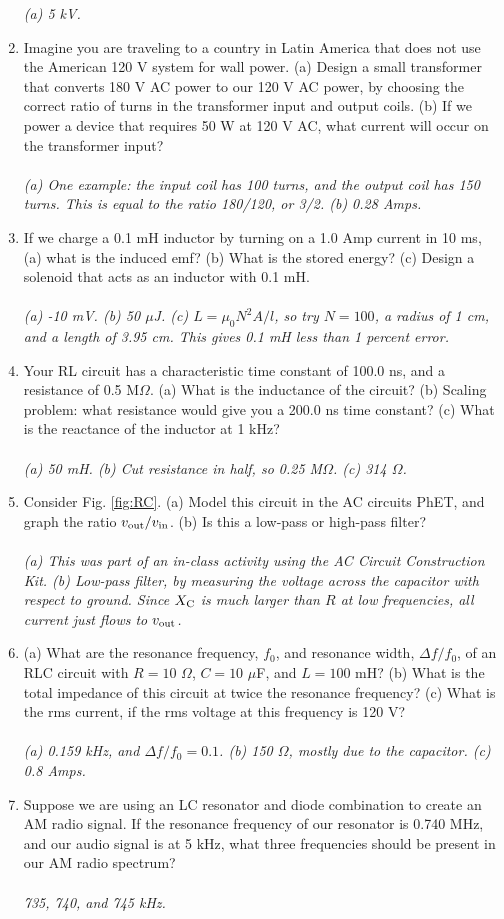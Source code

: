 \documentclass[12pt,twocolumn]{article}
\begin{document}
\begin{enumerate}
\textit{(a) 5 kV.}
\item Imagine you are traveling to a country in Latin America that does not use the American 120 V system for wall power.  (a) Design a small transformer that converts 180 V AC power to our 120 V AC power, by choosing the correct ratio of turns in the transformer input and output coils. (b) If we power a device that requires 50 W at 120 V AC, what current will occur on the transformer input? \\ \\
\textit{(a) One example: the input coil has 100 turns, and the output coil has 150 turns.  This is equal to the ratio 180/120, or 3/2. (b) 0.28 Amps.}
\item If we charge a 0.1 mH inductor by turning on a 1.0 Amp current in 10 ms, (a) what is the induced emf? (b) What is the stored energy? (c) Design a solenoid that acts as an inductor with 0.1 mH. \\ \\
\textit{(a) -10 mV. (b) 50 $\mu$J. (c) $L = \mu_0 N^2 A / l$, so try $N = 100$, a radius of 1 cm, and a length of 3.95 cm.  This gives 0.1 mH less than 1 percent error.}
\item Your RL circuit has a characteristic time constant of 100.0 ns, and a resistance of 0.5 M$\Omega$. (a) What is the inductance of the circuit? (b) Scaling problem: what resistance would give you a 200.0 ns time constant? (c) What is the reactance of the inductor at 1 kHz? \\ \\
\textit{(a) 50 mH. (b) Cut resistance in half, so 0.25 M$\Omega$. (c) 314 $\Omega$.}
\item Consider Fig. \ref{fig:RC}.  (a) Model this circuit in the AC circuits PhET, and graph the ratio $v_{\rm out}/v_{\rm in}$. (b) Is this a low-pass or high-pass filter? \\ \\
\textit{(a) This was part of an in-class activity using the AC Circuit Construction Kit.  (b) Low-pass filter, by measuring the voltage across the capacitor with respect to ground.  Since $X_{\rm C}$ is much larger than $R$ at low frequencies, all current just flows to $v_{\rm out}$. }
\item (a) What are the resonance frequency, $f_0$, and resonance width, $\Delta f/f_0$, of an RLC circuit with $R = 10$ $\Omega$, $C = 10$ $\mu$F, and $L = 100$ mH? (b) What is the total impedance of this circuit at twice the resonance frequency? (c) What is the rms current, if the rms voltage at this frequency is 120 V? \\ \\
\textit{(a) 0.159 kHz, and  $\Delta f/f_0 = 0.1$. (b) 150 $\Omega$, mostly due to the capacitor. (c) 0.8 Amps.}
\item Suppose we are using an LC resonator and diode combination to create an AM radio signal.  If the resonance frequency of our resonator is 0.740 MHz, and our audio signal is at 5 kHz, what three frequencies should be present in our AM radio spectrum? \\ \\
\textit{735, 740, and 745 kHz.}
\end{enumerate}
\end{document}
